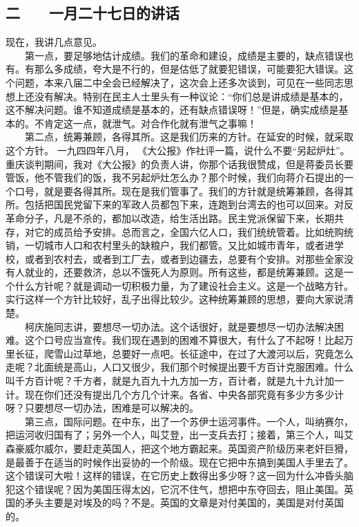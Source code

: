 \documentclass[cn,11pt,chinese]{elegantbook}
\def\myformat#1{\hfil\hfil #1}
\begin{document}
\subsection*{\myformat{二　　一月二十七日的讲话}}
现在，我讲几点意见。\\
　　第一点，要足够地估计成绩。我们的革命和建设，成绩是主要的，缺点错误也有。有那么多成绩，夸大是不行的，但是估低了就要犯错误，可能要犯大错误。这个问题，本来八届二中全会已经解决了，这次会上还多次谈到，可见在一些同志思想上还没有解决。特别在民主人士里头有一种议论：“你们总是讲成绩是基本的，这不解决问题。谁不知道成绩是基本的，还有缺点错误呀！”但是，确实成绩是基本的。不肯定这一点，就泄气。对合作化就有泄气之事嘛！\\
　　第二点，统筹兼顾，各得其所。这是我们历来的方针。在延安的时候，就采取这个方针。 一九四四年八月， 《大公报》作社评一篇，说什么不要“另起炉灶”。重庆谈判期间，我对《大公报》的负责人讲，你那个话我很赞成，但是蒋委员长要管饭，他不管我们的饭，我不另起炉灶怎么办？那个时候，我们向蒋介石提出的一个口号，就是要各得其所。现在是我们管事了。我们的方针就是统筹兼顾，各得其所。包括把国民党留下来的军政人员都包下来，连跑到台湾去的也可以回来。对反革命分子，凡是不杀的，都加以改造，给生活出路。民主党派保留下来，长期共存，对它的成员给予安排。总而言之，全国六亿人口，我们统统管着。比如统购统销，一切城市人口和农村里头的缺粮户，我们都管。又比如城市青年，或者进学校，或者到农村去，或者到工厂去，或者到边疆去，总要有个安排。对那些全家没有人就业的，还要救济，总以不饿死人为原则。所有这些，都是统筹兼顾。这是一个什么方针呢？就是调动一切积极力量，为了建设社会主义。这是一个战略方针。实行这样一个方针比较好，乱子出得比较少。这种统筹兼顾的思想，要向大家说清楚。\\
　　柯庆施同志讲，要想尽一切办法。这个话很好，就是要想尽一切办法解决困难。这个口号应当宣传。我们现在遇到的困难不算很大，有什么了不起呀！比起万里长征，爬雪山过草地，总要好一点吧。长征途中，在过了大渡河以后，究竟怎么走呢？北面统是高山，人口又很少，我们那个时候提出要千方百计克服困难。什么叫千方百计呢？千方者，就是九百九十九方加一方，百计者，就是九十九计加一计。现在你们还没有提出几个方几个计来。各省、中央各部究竟有多少方多少计呀？只要想尽一切办法，困难是可以解决的。\\
　　第三点，国际问题。在中东，出了一个苏伊士运河事件。一个人，叫纳赛尔，把运河收归国有了；另外一个人，叫艾登，出一支兵去打；接着，第三个人，叫艾森豪威尔威尔，要赶走英国人，把这个地方霸起来。英国资产阶级历来老奸巨猾，是最善于在适当的时候作出妥协的一个阶级。现在它把中东搞到美国人手里去了。这个错误可大啦！这样的错误，在它历史上数得出多少呀？这一回为什么冲昏头脑犯这个错误呢？因为美国压得太凶，它沉不住气，想把中东夺回去，阻止美国。英国的矛头主要是对埃及的吗？不是。英国的文章是对付美国的，美国是对付英国的。\\
\end{document}
